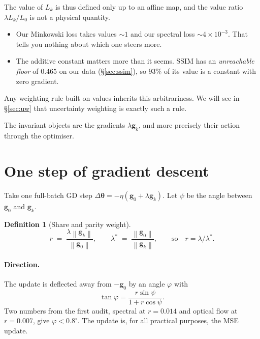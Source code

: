 \documentclass[11pt,a4paper]{article}
\theoremstyle{definition}
\newtheorem{definition}{Definition}
\theoremstyle{remark}
\newcommand{\norm}[1]{\left\lVert #1 \right\rVert}
\newcommand{\g}{\bm{g}}
\newcommand{\btheta}{\bm{\theta}}
\begin{document}
The value of $L_k$ is thus defined only up to an affine map, and the value ratio
$\lambda L_k/L_0$ is not a physical quantity.
\begin{itemize}[nosep]
\item Our Minkowski loss takes values $\sim1$ and our spectral loss $\sim4\times10^{-3}$.
  That tells you nothing about which one steers more.
\item The additive constant matters more than it seems. SSIM has an \emph{unreachable
  floor} of $0.465$ on our data (\S\ref{sec:ssim}), so $93\%$ of its value is a constant with
  zero gradient.
\end{itemize}
Any weighting rule built on values inherits this arbitrariness. We will see in
\S\ref{sec:uw} that uncertainty weighting is exactly such a rule.

The invariant objects are the gradients $\lambda\g_k$, and more precisely their action
through the optimiser.

\section{One step of gradient descent}

Take one full-batch GD step $\Delta\btheta=-\eta(\g_0+\lambda\g_k)$. Let $\psi$ be the angle
between $\g_0$ and $\g_k$.

\begin{definition}[Share and parity weight]
\begin{equation}
  r \;=\; \frac{\lambda\norm{\g_k}}{\norm{\g_0}}, \qquad
  \lambda^* \;=\; \frac{\norm{\g_0}}{\norm{\g_k}}, \qquad\text{so}\quad r=\lambda/\lambda^*.
\end{equation}
\end{definition}

\paragraph{Direction.}
The update is deflected away from $-\g_0$ by an angle $\varphi$ with
\begin{equation}\label{eq:deflect}
  \tan\varphi = \frac{r\sin\psi}{1+r\cos\psi}.
\end{equation}
Two numbers from the first audit, spectral at $r=0.014$ and optical flow at $r=0.007$, give
$\varphi<0.8^\circ$. The update is, for all practical purposes, the MSE update.
\end{document}
